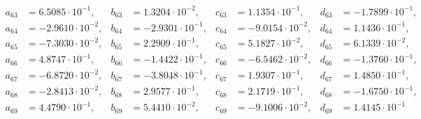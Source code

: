 \begin{align*}
  a_{ 63 } &= 6.5085 \cdot 10^{ -1 }, & b_{ 63 } &= 1.3204 \cdot 10^{ -2 }, & c_{ 63 } &= 1.1354 \cdot 10^{ -1 }, & d_{ 63 } &= -1.7899 \cdot 10^{ -1 }, \\ 
  a_{ 64 } &= -2.9610 \cdot 10^{ -2 }, & b_{ 64 } &= -2.9301 \cdot 10^{ -1 }, & c_{ 64 } &= -9.0154 \cdot 10^{ -2 }, & d_{ 64 } &= 1.1436 \cdot 10^{ -1 }, \\ 
  a_{ 65 } &= -7.3030 \cdot 10^{ -2 }, & b_{ 65 } &= 2.2909 \cdot 10^{ -1 }, & c_{ 65 } &= 5.1827 \cdot 10^{ -2 }, & d_{ 65 } &= 6.1339 \cdot 10^{ -2 }, \\ 
  a_{ 66 } &= 4.8747 \cdot 10^{ -1 }, & b_{ 66 } &= -1.4422 \cdot 10^{ -1 }, & c_{ 66 } &= -6.5462 \cdot 10^{ -2 }, & d_{ 66 } &= -1.3760 \cdot 10^{ -1 }, \\ 
  a_{ 67 } &= -6.8720 \cdot 10^{ -2 }, & b_{ 67 } &= -3.8048 \cdot 10^{ -1 }, & c_{ 67 } &= 1.9307 \cdot 10^{ -1 }, & d_{ 67 } &= 1.4850 \cdot 10^{ -1 }, \\ 
  a_{ 68 } &= -2.8413 \cdot 10^{ -2 }, & b_{ 68 } &= 2.9577 \cdot 10^{ -1 }, & c_{ 68 } &= 2.1719 \cdot 10^{ -1 }, & d_{ 68 } &= -1.6750 \cdot 10^{ -1 }, \\ 
  a_{ 69 } &= 4.4790 \cdot 10^{ -1 }, & b_{ 69 } &= 5.4410 \cdot 10^{ -2 }, & c_{ 69 } &= -9.1006 \cdot 10^{ -2 }, & d_{ 69 } &= 1.4145 \cdot 10^{ -1 }
\end{align*}
